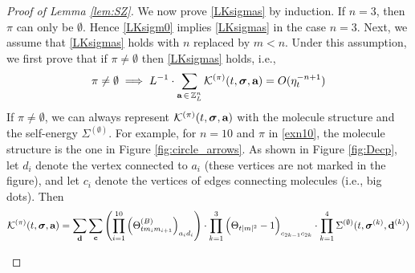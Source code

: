 \documentclass[10pt,reqno]{article}
\theoremstyle{plain} %
\theoremstyle{remark}
\numberwithin{equation}{section}
\begin{document}
\begin{proof}[ Proof of Lemma  \ref{lem:SZ}]
We now prove \eqref{LKsigmas} by  induction. If $n=3$, then $\pi$ can only be $\emptyset$. Hence \eqref{LKsigm0} implies \eqref{LKsigmas} in the case $n=3$. Next, we assume that \eqref{LKsigmas} holds with \( n \) replaced by \( m < n \). Under this assumption, we first prove that if  $\pi\ne \emptyset$ then \eqref{LKsigmas} holds, i.e., 
\begin{align} 
 \pi\ne\emptyset\implies  L^{-1}\cdot \sum_{\textbf{a}\,\in \,\mathbb Z^{n}_L } 
{\cal K}^{(\pi)}(t, \boldsymbol{\sigma}, \textbf{a})=O(\eta_t^{-n+1})  
\end{align}
If $\pi\ne \emptyset$, we can always represent 
$ 
{\cal K}^{(\pi)}(t, \boldsymbol{\sigma}, \textbf{a})
$ with the molecule structure and the self-energy  $\Sigma^{(\emptyset)}$. For example, for $n=10$ and $\pi$ in \eqref{exn10}, the molecule structure is the one in Figure \ref{fig:circle_arrows}. As shown in Figure \ref{fig:Decp}, let $d_i$ denote the vertex connected to $a_i$ (these vertices are not marked in the figure), and let $c_i$ denote the vertices of edges connecting molecules (i.e., big dots). Then
$$
{\cal K}^{(\pi)}(t, \boldsymbol{\sigma}, \textbf{a})=
\sum_{\textbf{d}}\sum_{\textbf{c}}\left(\prod_{i=1}^{10}\left(\Theta^{(B)}_{tm_im_{i+1}}\right)_{a_id_i}\right)\cdot \prod_{k=1}^3\Big(\Theta_{{t|m|^2}}-1\Big)_{c_{2k-1}c_{2k}}
\cdot
 \prod_{k=1}^4{\Sigma}^{(\emptyset)}(t, \boldsymbol{\sigma}^{(k)}, \textbf{d}^{(k)})
$$
\begin{figure}[ht]
    \centering
\end{figure}
\end{proof}
\end{document}

